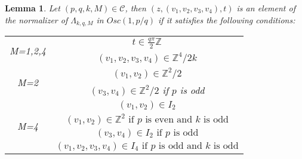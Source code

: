 \documentclass[12pt]{amsart}
\theoremstyle{plain}
\newtheorem{lem}[thm]{Lemma}
\theoremstyle{definition}
\theoremstyle{remark}
\begin{document}
\begin{lem}
	Let $(p,q,k,M) \in \mathcal{C}$, then $(z, (v_1,v_2,v_3,v_4),t)$ is an element of the normalizer of $\Lambda_{k,q,M}$ in $Osc(1,p/q)$ if it satisfies the following conditions:

   \def\arraystretch{1.5}
   \begin{center}
   \begin{tabular}{|c|c|}\hline
   \multirow{2}{*}{M=1,2,4} & $t \in \frac{q \pi}{2} \mathbb{Z}$   \\\cline{2-2}
	   & $(v_1,v_2,v_3,v_4) \in \mathbb{Z}^4 / {2 k}$  \\\hline
   \multirow{2}{*}{M=2} & $(v_1,v_2) \in \mathbb{Z}^2/2$  \\\cline{2-2}
	   & $(v_3,v_4) \in \mathbb{Z}^2/2$ if $p$ is odd   \\\hline
   \multirow{4}{*}{M=4} & $(v_1,v_2) \in I_2$  \\\cline{2-2}
	   & $(v_1,v_2) \in \mathbb{Z}^2 \text{ if } p \text{ is even and } k \text{ is odd}$  \\\cline{2-2}
	   & $(v_3,v_4) \in I_2 \text{ if } p \text{ is odd}$  \\\cline{2-2}
	   & $(v_1,v_2,v_3,v_4) \in I_4 \text{ if } p \text{ is odd and } k \text{ is odd}$  \\\hline
   \end{tabular}
   \end{center}
   
\end{lem}
\end{document}
